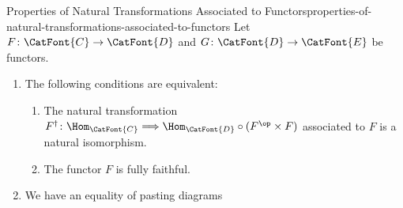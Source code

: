 \begin{proposition}{Properties of Natural Transformations Associated to Functors}{properties-of-natural-transformations-associated-to-functors}%
    Let $F\colon\CatFont{C}\to\CatFont{D}$ and $G\colon\CatFont{D}\to\CatFont{E}$ be functors.
    \begin{enumerate}
        \item\label{properties-of-natural-transformations-associated-to-functors-interaction-with-natural-isomorphisms}The following conditions are equivalent:
            \begin{enumerate}
                \item\label{properties-of-natural-transformations-associated-to-functors-interaction-with-natural-isomorphisms-a}The natural transformation $F^{\dagger}\colon\Hom_{\CatFont{C}}\Longrightarrow{\Hom_{\CatFont{D}}}\circ{(F^{\op}\times F)}$ associated to $F$ is a natural isomorphism.
                \item\label{properties-of-natural-transformations-associated-to-functors-interaction-with-natural-isomorphisms-b}The functor $F$ is fully faithful.
            \end{enumerate}
        \item\label{properties-of-natural-transformations-associated-to-functors-interaction-with-composition}We have an equality of pasting diagrams
            \begin{webcompile}
\end{webcompile}
\end{enumerate}
\end{proposition}
